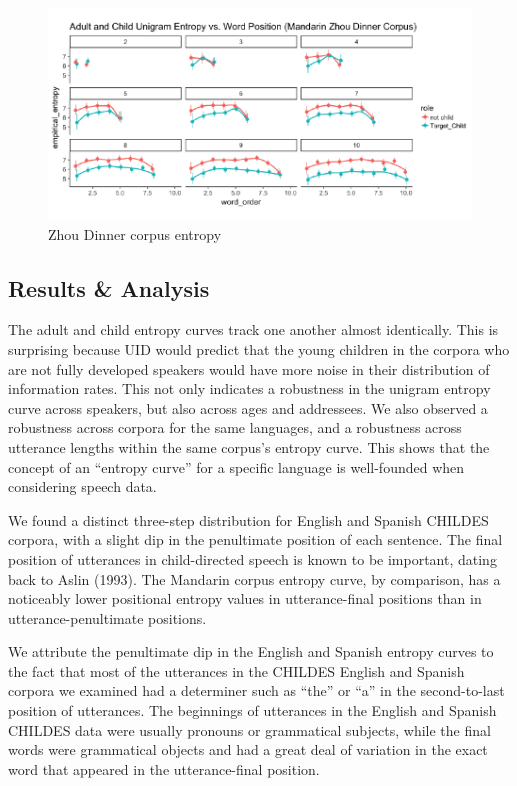 \documentclass[10pt, letterpaper]{article}
\newenvironment{CodeChunk}{}{}
\begin{document}
\begin{CodeChunk}
\begin{figure}[h]

{\centering \includegraphics{figs/zhou_PE-1} 

}

\caption[Zhou Dinner corpus entropy]{Zhou Dinner corpus entropy}\label{fig:zhou_PE}
\end{figure}
\end{CodeChunk}

\subsection{Results \& Analysis}\label{results-analysis}

The adult and child entropy curves track one another almost identically.
This is surprising because UID would predict that the young children in
the corpora who are not fully developed speakers would have more noise
in their distribution of information rates. This not only indicates a
robustness in the unigram entropy curve across speakers, but also across
ages and addressees. We also observed a robustness across corpora for
the same languages, and a robustness across utterance lengths within the
same corpus's entropy curve. This shows that the concept of an ``entropy
curve'' for a specific language is well-founded when considering speech
data.

We found a distinct three-step distribution for English and Spanish
CHILDES corpora, with a slight dip in the penultimate position of each
sentence. The final position of utterances in child-directed speech is
known to be important, dating back to Aslin (1993). The Mandarin corpus
entropy curve, by comparison, has a noticeably lower positional entropy
values in utterance-final positions than in utterance-penultimate
positions.

We attribute the penultimate dip in the English and Spanish entropy
curves to the fact that most of the utterances in the CHILDES English
and Spanish corpora we examined had a determiner such as ``the'' or
``a'' in the second-to-last position of utterances. The beginnings of
utterances in the English and Spanish CHILDES data were usually pronouns
or grammatical subjects, while the final words were grammatical objects
and had a great deal of variation in the exact word that appeared in the
utterance-final position.
\end{document}
